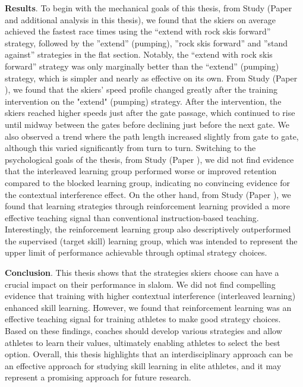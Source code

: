 \textbf{Results}. To begin with the mechanical goals of this thesis, from Study  (Paper  and additional analysis in this thesis), we found that the skiers on average achieved the fastest race times using the “extend with rock skis forward” strategy, followed by the ”extend” (pumping), ”rock skis forward” and ”stand against” strategies in the flat section. Notably, the “extend with rock skis forward” strategy was only marginally better than the “extend” (pumping) strategy, which is simpler and nearly as effective on its own. From Study  (Paper ), we found that the skiers' speed profile changed greatly after the training intervention on the "extend" (pumping) strategy. After the intervention, the skiers reached higher speeds just after the gate passage, which continued to rise until midway between the gates before declining just before the next gate. We also observed a trend where the path length increased slightly from gate to gate, although this varied significantly from turn to turn. Switching to the psychological goals of the thesis, from Study  (Paper ), we did not find evidence that the interleaved learning group performed worse or improved retention compared to the blocked learning group, indicating no convincing evidence for the contextual interference effect. On the other hand, from Study  (Paper ), we found that learning strategies through reinforcement learning provided a more effective teaching signal than conventional instruction-based teaching. Interestingly, the reinforcement learning group also descriptively outperformed the supervised (target skill) learning group, which was intended to represent the upper limit of performance achievable through optimal strategy choices. 

\textbf{Conclusion}. This thesis shows that the strategies skiers choose can have a crucial impact on their performance in slalom. We did not find compelling evidence that training with higher contextual interference (interleaved learning) enhanced skill learning. However, we found that reinforcement learning was an effective teaching signal for training athletes to make good strategy choices. Based on these findings, coaches should develop various strategies and allow athletes to learn their values, ultimately enabling athletes to select the best option. Overall, this thesis highlights that an interdisciplinary approach can be an effective approach for studying skill learning in elite athletes, and it may represent a promising approach for future research. 
